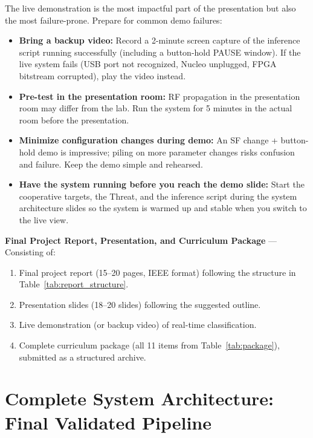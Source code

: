 \documentclass[11pt,letterpaper]{article}
\begin{document}
	\begin{tcolorbox}[warning={Live Demo Preparation}]
		The live demonstration is the most impactful part of the presentation but also the most failure-prone. Prepare for common demo failures:
		\begin{itemize}
			\item \textbf{Bring a backup video:} Record a 2-minute screen capture of the inference script running successfully (including a button-hold PAUSE window). If the live system fails (USB port not recognized, Nucleo unplugged, FPGA bitstream corrupted), play the video instead.
			\item \textbf{Pre-test in the presentation room:} RF propagation in the presentation room may differ from the lab. Run the system for 5 minutes in the actual room before the presentation.
			\item \textbf{Minimize configuration changes during demo:} An SF change + button-hold demo is impressive; piling on more parameter changes risks confusion and failure. Keep the demo simple and rehearsed.
			\item \textbf{Have the system running before you reach the demo slide:} Start the cooperative targets, the Threat, and the inference script during the system architecture slides so the system is warmed up and stable when you switch to the live view.
		\end{itemize}
	\end{tcolorbox}

	\begin{tcolorbox}[deliverable={Session 20 Deliverable}]
		\textbf{Final Project Report, Presentation, and Curriculum Package} --- Consisting of:
		\begin{enumerate}
			\item Final project report (15--20 pages, IEEE format) following the structure in Table~\ref{tab:report_structure}.
			\item Presentation slides (18--20 slides) following the suggested outline.
			\item Live demonstration (or backup video) of real-time classification.
			\item Complete curriculum package (all 11 items from Table~\ref{tab:package}), submitted as a structured archive.
		\end{enumerate}
	\end{tcolorbox}

	\newpage
	\section{Complete System Architecture: Final Validated Pipeline}
\end{document}
